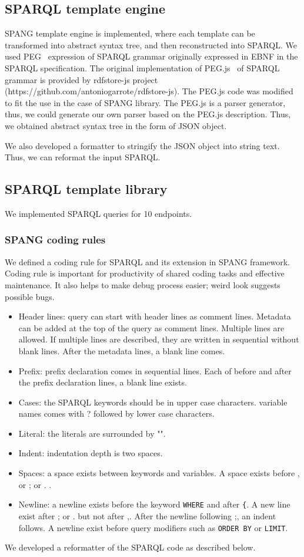\documentclass[runningheads]{llncs}
\begin{document}
\subsection{SPARQL template engine}
SPANG template engine is implemented, where each template can be transformed into abstract syntax tree, and then reconstructed into SPARQL. 
We used PEG~\cite{peg} expression of SPARQL grammar originally expressed in EBNF in the SPARQL specification. The original implementation of PEG.js~\cite{pegjs} of SPARQL grammar is provided by rdfstore-js project (https://github.com/antoniogarrote/rdfstore-js).
The PEG.js code was modified to fit the use in the case of SPANG library.
The PEG.js is a parser generator, thus, we could generate our own parser based on the PEG.js description. Thus, we obtained abstract syntax tree in the form of JSON object.

We also developed a formatter to stringify the JSON object into string text. Thus, we can reformat the input SPARQL.

\subsection{SPARQL template library}
We implemented SPARQL queries for 10 endpoints.

\subsubsection{SPANG coding rules}
We defined a coding rule for SPARQL and its extension in SPANG framework. Coding rule is important for productivity of shared coding tasks and effective maintenance. It also helps to make debug process easier; weird look suggests possible bugs. 
\begin{itemize}
    \item Header lines: query can start with header lines as comment lines. Metadata can be added at the top of the query as comment lines. Multiple lines are allowed. If multiple lines are described, they are written in sequential without blank lines. After the metadata lines, a blank line comes.
    \item Prefix: prefix declaration comes in sequential lines. Each of before and after the prefix declaration lines, a blank line exists.
    \item Cases: the SPARQL keywords should be in upper case characters. variable names comes with ? followed by lower case characters.
    \item Literal: the literals are surrounded by "".
    \item Indent: indentation depth is two spaces.
    \item Spaces: a space exists between keywords and variables. A space exists before , or ; or . .
    \item Newline: a newline exists before the keyword \texttt{WHERE} and after \texttt{\{}. A new line exist after ; or . but not after ,. After the newline following ;, an indent follows. A newline exist before query modifiers such as \texttt{ORDER BY} or \texttt{LIMIT}.
\end{itemize}
We developed a reformatter of the SPARQL code as described below.
\end{document}
